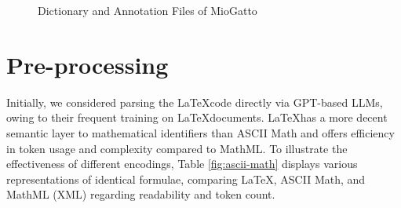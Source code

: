 \begin{figure}[htpb]
  \centering
  \quad 
  \caption[LaTeXML Preprocessing]{Dictionary and Annotation Files of MioGatto}\label{fig:miogatto-data}
\end{figure}

\section{Pre-processing}\label{sec:pre-processing}

Initially, we considered parsing the \LaTeX \space code directly via GPT-based LLMs, owing to their frequent training on \LaTeX \space documents. \LaTeX \space has a more decent semantic layer to mathematical identifiers than ASCII Math and offers efficiency in token usage and complexity compared to MathML. To illustrate the effectiveness of different encodings, Table \ref{fig:ascii-math} displays various representations of identical formulae, comparing \LaTeX, ASCII Math, and MathML (XML) regarding readability and token count.


